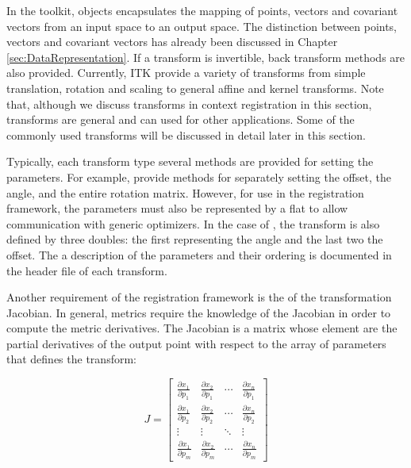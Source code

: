 
\def\tableconfiguration{ | p{4cm} | p{3cm} | p{3cm} | p{4cm} | }

In the toolkit,  objects encapsulates the mapping of
points, vectors and covariant vectors from an input space to an output space.
The distinction between points, vectors and covariant vectors has already
been discussed in Chapter \ref{sec:DataRepresentation}. If a transform is
invertible, back transform methods are also provided. Currently, 
ITK provide a variety of transforms from simple translation, rotation and 
scaling to general affine and kernel transforms. Note that, although we
discuss transforms in context registration in this section, transforms
are general and can used for other applications. Some of the commonly used 
transforms will be discussed in detail later in this section.

Typically, each transform type several methods are provided for setting
the parameters. For example,  provide methods for
separately setting the offset, the angle, and the entire rotation matrix.
However, for use in the registration framework, the parameters must also
be represented by a flat  to allow communication
with generic optimizers. In the case of , the transform
is also defined by three doubles: the first representing the angle and 
the last two the offset. The a description of the parameters and their
ordering is documented in the header file of each transform.

Another requirement of the registration framework is the of the
transformation Jacobian. In general, metrics require the knowledge of 
the Jacobian in order to compute the metric derivatives. 
The Jacobian is a matrix whose element are the partial derivatives of the 
output point with respect to the array of parameters that defines the 
transform:

\begin{equation}
J=\left[ \begin{array}{cccc}
\frac{\partial x_{1}}{\partial p_{1}} & 
\frac{\partial x_{2}}{\partial p_{1}} & 
\cdots  & \frac{\partial x_{n}}{\partial p_{1}}\\
\frac{\partial x_{1}}{\partial p_{2}} & 
\frac{\partial x_{2}}{\partial p_{2}} & 
\cdots  & \frac{\partial x_{n}}{\partial p_{2}}\\
\vdots  & \vdots  & \ddots  & \vdots \\
\frac{\partial x_{1}}{\partial p_{m}} & 
\frac{\partial x_{2}}{\partial p_{m}} & 
\cdots  & \frac{\partial x_{n}}{\partial p_{m}}
\end{array}\right]
\end{equation}
 




